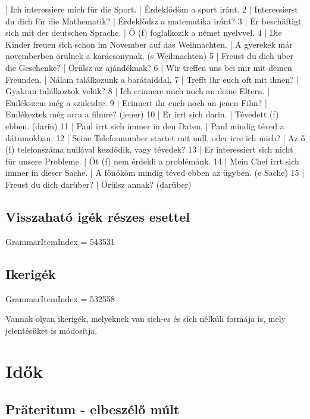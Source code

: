 \documentclass{article}
\newenvironment{desc}{\verbatim}{\endverbatim}
\newenvironment{exmp}{\verbatim}{\endverbatim}
\begin{document}
\begin{exmp}
1 | Ich interessiere mich für die Sport. | Érdeklődöm a sport iránt.
2 | Interessierst du dich für die Mathematik? | Érdeklődsz a matematika iránt?
3 | Er beschäftigt sich mit der deutschen Sprache. | Ő (f) foglalkozik a német nyelvvel.
4 | Die Kinder freuen sich schon im November auf das Weihnachten. | A gyerekek már novemberben örülnek a karácsonynak. (s Weihnachten)
5 | Freust du dich über die Geschenke? | Örülsz az ajándéknak?
6 | Wir treffen uns bei mir mit deinen Freunden. | Nálam találkozunk a barátaiddal.
7 | Trefft ihr euch oft mit ihnen? | Gyakran találkoztok velük? 
8 | Ich erinnere mich noch an deine Eltern. | Emlékszem még a szüleidre.
9 | Erinnert ihr euch noch an jenen Film? | Emlékeztek még arra a filmre? (jener) 
10 | Er irrt sich darin. | Tévedett (f) ebben. (darin)
11 | Paul irrt sich immer in den Daten. | Paul mindig téved a dátumokban.
12 | Seine Telefonnumber startet mit null, oder irre ich mich? | Az ő (f) telefonszáma nullával kezdődik, vagy tévedek?
13 | Er interessiert sich nicht für unsere Probleme. | Őt (f) nem érdekli a problémánk.
14 | Mein Chef irrt sich immer in dieser Sache. | A főnököm mindig téved ebben az ügyben. (e Sache)
15 | Freust du dich darüber? | Örülsz annak? (darüber)
\end{exmp}

\subsection{Visszaható igék részes esettel}

GrammarItemIndex = 543531

\subsection{Ikerigék}

GrammarItemIndex = 532558

\begin{desc}
Vannak olyan ikerigék, melyeknek van sich-es és sich nélküli
formája is, mely jelentésüket is módosítja.
\end{desc}

\section{Idők}

\subsection{Präteritum - elbeszélő múlt}
\end{document}
